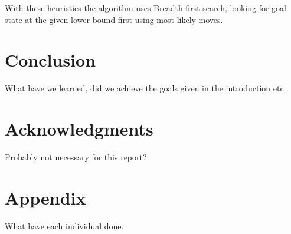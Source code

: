 \documentclass[11pt]{article}
\begin{document}
With these heuristics the algorithm uses Breadth first search, looking for goal state at the given lower bound first using most likely moves.
\section{Conclusion}
What have we learned, did we achieve the goals given in the introduction etc.

\section{Acknowledgments}
Probably not necessary for this report?




\section*{Appendix}
What have each individual done.
\end{document}

